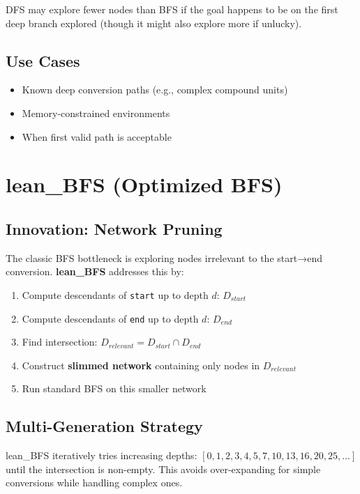 \documentclass[11pt,a4paper]{report}
\begin{document}
DFS may explore fewer nodes than BFS if the goal happens to be on the first deep branch explored (though it might also explore more if unlucky).

\subsection{Use Cases}

\begin{itemize}[leftmargin=*]
  \item Known deep conversion paths (e.g., complex compound units)
  \item Memory-constrained environments
  \item When first valid path is acceptable
\end{itemize}

\section{lean\_BFS (Optimized BFS)}

\subsection{Innovation: Network Pruning}

The classic BFS bottleneck is exploring nodes irrelevant to the start→end conversion. \textbf{lean\_BFS} addresses this by:
\begin{enumerate}[leftmargin=*]
  \item Compute descendants of \texttt{start} up to depth $d$: $D_{start}$
  \item Compute descendants of \texttt{end} up to depth $d$: $D_{end}$
  \item Find intersection: $D_{relevant} = D_{start} \cap D_{end}$
  \item Construct \textbf{slimmed network} containing only nodes in $D_{relevant}$
  \item Run standard BFS on this smaller network
\end{enumerate}

\subsection{Multi-Generation Strategy}

lean\_BFS iteratively tries increasing depths: $[0, 1, 2, 3, 4, 5, 7, 10, 13, 16, 20, 25, \ldots]$ until the intersection is non-empty. This avoids over-expanding for simple conversions while handling complex ones.
\end{document}
